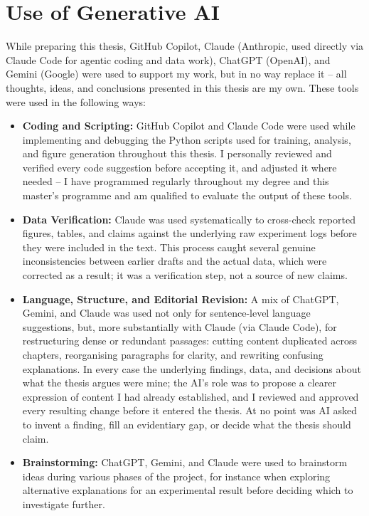 \section*{Use of Generative AI}
While preparing this thesis, GitHub Copilot, Claude (Anthropic, used
directly via Claude Code for agentic coding and data work), ChatGPT
(OpenAI), and Gemini (Google) were used to support my work, but in no
way replace it -- all thoughts, ideas, and conclusions presented in
this thesis are my own. These tools were used in the following ways:

\begin{itemize}
    \item \textbf{Coding and Scripting:} GitHub Copilot and Claude
    Code were used while implementing and debugging the Python
    scripts used for training, analysis, and figure generation
    throughout this thesis. I personally reviewed and verified every
    code suggestion before accepting it, and adjusted it where
    needed -- I have programmed regularly throughout my degree and
    this master's programme and am qualified to evaluate the output
    of these tools.

    \item \textbf{Data Verification:} Claude was used systematically
    to cross-check reported figures, tables, and claims against the
    underlying raw experiment logs before they were included in the
    text. This process caught several genuine inconsistencies between
    earlier drafts and the actual data, which were corrected as a
    result; it was a verification step, not a source of new claims.

    \item \textbf{Language, Structure, and Editorial Revision:} A mix
    of ChatGPT, Gemini, and Claude was used not only for sentence-level
    language suggestions, but, more substantially with Claude (via
    Claude Code), for restructuring dense or redundant passages:
    cutting content duplicated across chapters, reorganising
    paragraphs for clarity, and rewriting confusing explanations. In
    every case the underlying findings, data, and decisions about what
    the thesis argues were mine; the AI's role was to propose a
    clearer expression of content I had already established, and I
    reviewed and approved every resulting change before it entered the
    thesis. At no point was AI asked to invent a finding, fill an
    evidentiary gap, or decide what the thesis should claim.

    \item \textbf{Brainstorming:} ChatGPT, Gemini, and Claude were
    used to brainstorm ideas during various phases of the project,
    for instance when exploring alternative explanations for an
    experimental result before deciding which to investigate further.


\end{itemize}
